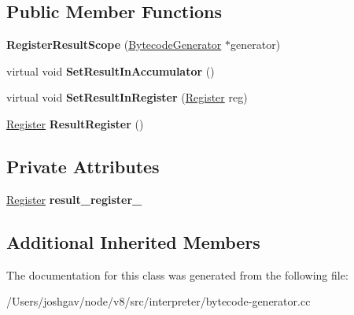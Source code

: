 \subsection*{Public Member Functions}
\begin{DoxyCompactItemize}
\item 
{\bfseries Register\+Result\+Scope} (\hyperlink{classv8_1_1internal_1_1interpreter_1_1_bytecode_generator}{Bytecode\+Generator} $\ast$generator)\hypertarget{classv8_1_1internal_1_1interpreter_1_1_bytecode_generator_1_1_register_result_scope_a0924adf7e1cd43d67d0d35c46b4335a0}{}\label{classv8_1_1internal_1_1interpreter_1_1_bytecode_generator_1_1_register_result_scope_a0924adf7e1cd43d67d0d35c46b4335a0}

\item 
virtual void {\bfseries Set\+Result\+In\+Accumulator} ()\hypertarget{classv8_1_1internal_1_1interpreter_1_1_bytecode_generator_1_1_register_result_scope_a340fde9bece1f19a28c72595c095f830}{}\label{classv8_1_1internal_1_1interpreter_1_1_bytecode_generator_1_1_register_result_scope_a340fde9bece1f19a28c72595c095f830}

\item 
virtual void {\bfseries Set\+Result\+In\+Register} (\hyperlink{classv8_1_1internal_1_1interpreter_1_1_register}{Register} reg)\hypertarget{classv8_1_1internal_1_1interpreter_1_1_bytecode_generator_1_1_register_result_scope_adb318e9733a93e5446314739527a2711}{}\label{classv8_1_1internal_1_1interpreter_1_1_bytecode_generator_1_1_register_result_scope_adb318e9733a93e5446314739527a2711}

\item 
\hyperlink{classv8_1_1internal_1_1interpreter_1_1_register}{Register} {\bfseries Result\+Register} ()\hypertarget{classv8_1_1internal_1_1interpreter_1_1_bytecode_generator_1_1_register_result_scope_a4d2aba11fe336df47f989f35fe5d8442}{}\label{classv8_1_1internal_1_1interpreter_1_1_bytecode_generator_1_1_register_result_scope_a4d2aba11fe336df47f989f35fe5d8442}

\end{DoxyCompactItemize}
\subsection*{Private Attributes}
\begin{DoxyCompactItemize}
\item 
\hyperlink{classv8_1_1internal_1_1interpreter_1_1_register}{Register} {\bfseries result\+\_\+register\+\_\+}\hypertarget{classv8_1_1internal_1_1interpreter_1_1_bytecode_generator_1_1_register_result_scope_a8e963000fa5d67cdfe947be29939a822}{}\label{classv8_1_1internal_1_1interpreter_1_1_bytecode_generator_1_1_register_result_scope_a8e963000fa5d67cdfe947be29939a822}

\end{DoxyCompactItemize}
\subsection*{Additional Inherited Members}


The documentation for this class was generated from the following file\+:\begin{DoxyCompactItemize}
\item 
/\+Users/joshgav/node/v8/src/interpreter/bytecode-\/generator.\+cc\end{DoxyCompactItemize}
